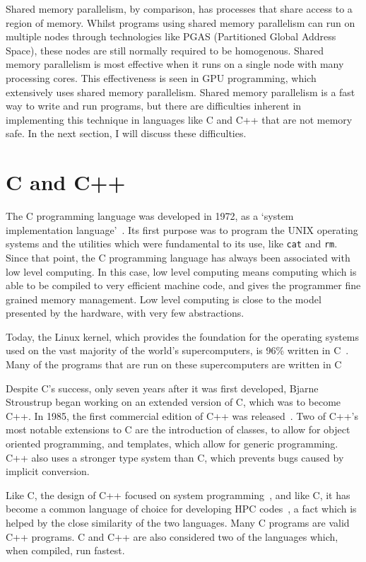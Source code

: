 Shared memory parallelism, by comparison, has processes that share access to a region of memory. Whilst programs using shared memory parallelism can run on multiple nodes through technologies like PGAS (Partitioned Global Address Space), these nodes are still normally required to be homogenous. Shared memory parallelism is most effective when it runs on a single node with many processing cores. This effectiveness is seen in GPU programming, which extensively uses shared memory parallelism.
Shared memory parallelism is a fast way to write and run programs, but there are difficulties inherent in implementing this technique in languages like C and C++ that are not memory safe. In the next section, I will discuss these difficulties.

\section{C and C++}\label{sec:c}
The C programming language was developed in 1972, as a `system implementation language'~\cite{Ritchie:1993}. Its first purpose was to program the UNIX operating systems and the utilities which were fundamental to its use, like \texttt{cat} and \texttt{rm}. Since that point, the C programming language has always been associated with low level computing. In this case, low level computing means computing which is able to be compiled to very efficient machine code, and gives the programmer fine grained memory management. Low level computing is close to the model presented by the hardware, with very few abstractions.

Today, the Linux kernel, which provides the foundation for the operating systems used on the vast majority of the world's supercomputers, is 96\% written in C~\cite{LinuxKernel}. Many of the programs that are run on these supercomputers are written in C~\cite{fftw, ffs, foam}

Despite C's success, only seven years after it was first developed, Bjarne Stroustrup began working on an extended version of C, which was to become C++. In 1985, the first commercial edition of C++ was released~\cite{DandE}. Two of C++'s most notable extensions to C are the introduction of classes, to allow for object oriented programming, and templates, which allow for generic programming. C++ also uses a stronger type system than C, which prevents bugs caused by implicit conversion.

Like C, the design of C++ focused on system programming~\cite{CplusEssence}, and like C, it has become a common language of choice for developing HPC codes~\cite{foam, tensorflow, lammps, gromacs}, a fact which is helped by the close similarity of the two languages. Many C programs are valid C++ programs. C and C++ are also considered two of the languages which, when compiled, run fastest.

